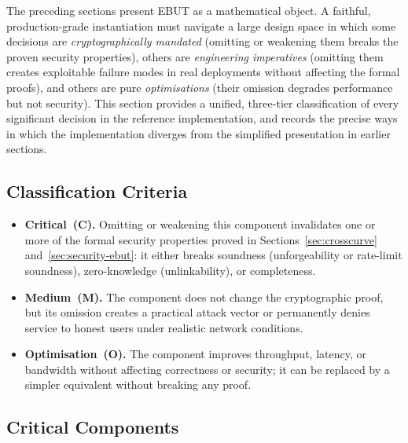 \documentclass[11pt]{article}
\theoremstyle{definitionstyle}
\theoremstyle{plain}
\begin{document}
The preceding sections present EBUT as a mathematical object.  A faithful,
production-grade instantiation must navigate a large design space in which
some decisions are \emph{cryptographically mandated} (omitting or weakening
them breaks the proven security properties), others are \emph{engineering
imperatives} (omitting them creates exploitable failure modes in real
deployments without affecting the formal proofs), and others are pure
\emph{optimisations} (their omission degrades performance but not security).
This section provides a unified, three-tier classification of every
significant decision in the reference implementation, and records the
precise ways in which the implementation diverges from the simplified
presentation in earlier sections.

\subsection{Classification Criteria}

\begin{itemize}[leftmargin=*]
\item \textbf{Critical~(C).} Omitting or weakening this component invalidates
  one or more of the formal security properties proved in
  Sections~\ref{sec:crosscurve} and~\ref{sec:security-ebut}: it either
  breaks soundness (unforgeability or rate-limit soundness), zero-knowledge
  (unlinkability), or completeness.
\item \textbf{Medium~(M).} The component does not change the cryptographic
  proof, but its omission creates a practical attack vector or permanently
  denies service to honest users under realistic network conditions.
\item \textbf{Optimisation~(O).} The component improves throughput, latency,
  or bandwidth without affecting correctness or security; it can be replaced
  by a simpler equivalent without breaking any proof.
\end{itemize}

\subsection{Critical Components}
\label{sec:critical}
\end{document}
